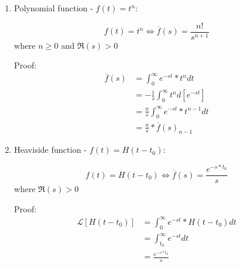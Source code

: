 \documentclass[10pt,a4paper]{article}
\begin{document}
\begin{enumerate}
     \item Polynomial function - $f(t)=t^n$:
     \begin{tcolorbox}[breakable,colback=white,colframe=black,width=\dimexpr\textwidth+12mm\relax,enlarge left by=-6mm]
        \begin{equation*} 
            f(t)=t^n \Leftrightarrow \overline{f}(s)=\frac{n!}{s^{n+1}} 
        \end{equation*}
        where $n\geq 0$ and $\Re (s)>0$
     \end{tcolorbox}
     Proof: 
     \begin{equation*} 
        \begin{aligned}
            \overline{f}(s)&=\int_{0}^{\infty}e^{-st}*t^n dt \\
            &= -\frac{1}{s}\int_{0}^{\infty}t^n d[e^{-st}] \\
            &= \frac{n}{s}\int_{0}^{\infty}e^{-st}*t^{n-1}dt \\
            &= \frac{n}{s}*\overline{f}(s)_{n-1}
        \end{aligned}
     \end{equation*}

     \item Heaviside function - $f(t)=H(t-t_0)$:
     \begin{tcolorbox}[breakable,colback=white,colframe=black,width=\dimexpr\textwidth+12mm\relax,enlarge left by=-6mm]
        \begin{equation*} 
        f(t)=H(t-t_0) \Leftrightarrow \overline{f}(s)=\frac{e^{-s*t_0}}{s}
        \end{equation*}
        where $\Re (s)>0$
     \end{tcolorbox}
     Proof: 
     \begin{equation*} 
        \begin{aligned}
            \mathcal{L}[H(t-t_0)]&=\int_{0}^{\infty}e^{-st}*H(t-t_0) dt \\
            &= \int_{t_0}^{\infty}e^{-st} dt \\
            &= \frac{e^{-s*t_0}}{s} 
        \end{aligned}
     \end{equation*}


\end{enumerate}
\end{document}
